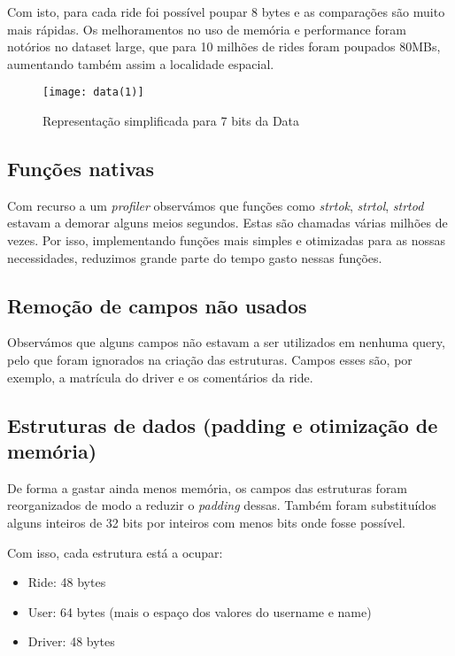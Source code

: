 \documentclass{article}
\begin{document}
            Com isto, para cada ride foi possível poupar 8 bytes e as comparações são
            muito mais rápidas. Os melhoramentos no uso de memória e performance foram
            notórios no dataset large, que para 10 milhões de rides foram poupados 80MBs,
            aumentando também assim a localidade espacial.
            \begin{figure}[h]
                \centering
                \texttt{[image: data(1)]}
                \caption{Representação simplificada para 7 bits da Data}
            \end{figure}
        \subsection{Funções nativas}
            Com recurso a um \textit{profiler} observámos que funções como \textit{strtok}, \textit{strtol},
            \textit{strtod} estavam a demorar alguns meios segundos. Estas são chamadas várias milhões de vezes.
            Por isso, implementando funções mais simples e otimizadas para as nossas necessidades, 
            reduzimos grande parte do tempo gasto nessas funções.
        \subsection{Remoção de campos não usados}
            Observámos que alguns campos não estavam a ser utilizados em nenhuma query, 
            pelo que foram ignorados na criação das estruturas.
            Campos esses são, por exemplo, a matrícula do driver e os comentários da ride.
        \subsection{Estruturas de dados (padding e otimização de memória)}
            De forma a gastar ainda menos memória, os campos das estruturas
            foram reorganizados de modo a reduzir o \textit{padding} dessas.
            Também foram substituídos alguns inteiros de 32 bits por inteiros com menos bits
            onde fosse possível.
            
            Com isso, cada estrutura está a ocupar:
            \begin{itemize}
                \item Ride: 48 bytes
                \item User: 64 bytes (mais o espaço dos valores do username e name)
                \item Driver: 48 bytes
            \end{itemize}
\end{document}
